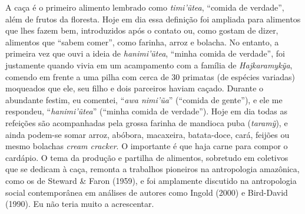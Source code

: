 A caça é o primeiro alimento lembrado como \emph{timi'ũtea}, ``comida de
verdade'', além de frutos da floresta. Hoje em dia essa definição foi
ampliada para alimentos que lhes fazem bem, introduzidos após o contato
ou, como gostam de dizer, alimentos que ``sabem comer'', como farinha,
arroz e bolacha. No entanto, a primeira vez que ouvi a ideia de
\emph{hanimi'ũtea}, ``minha comida de verdade'', foi justamente quando
vivia em um acampamento com a família de \emph{Hajkaramykỹa}, comendo em
frente a uma pilha com cerca de 30 primatas (de espécies variadas)
moqueados que ele, seu filho e dois parceiros haviam caçado. Durante o
abundante festim, eu comentei, ``\emph{awa nimi'ũa}'' (``comida de
gente''), e ele me respondeu, ``\emph{hanimi'ũtea}'' (``minha comida de
verdade''). Hoje em dia todas as refeições são acompanhadas pela grossa
farinha de mandioca puba (\emph{taramỹ}), e ainda podem-se somar arroz,
abóbora, macaxeira, batata-doce, cará, feijões ou mesmo bolachas
\emph{cream cracker}. O importante é que haja carne para compor o
cardápio. O tema da produção e partilha de alimentos, sobretudo em
coletivos que se dedicam à caça, remonta a trabalhos pioneiros na
antropologia amazônica, como os de Steward \& Faron (1959), e foi
amplamente discutido na antropologia social contemporânea em análises de
autores como Ingold (2000) e Bird-David (1990). Eu não teria muito a
acrescentar.

